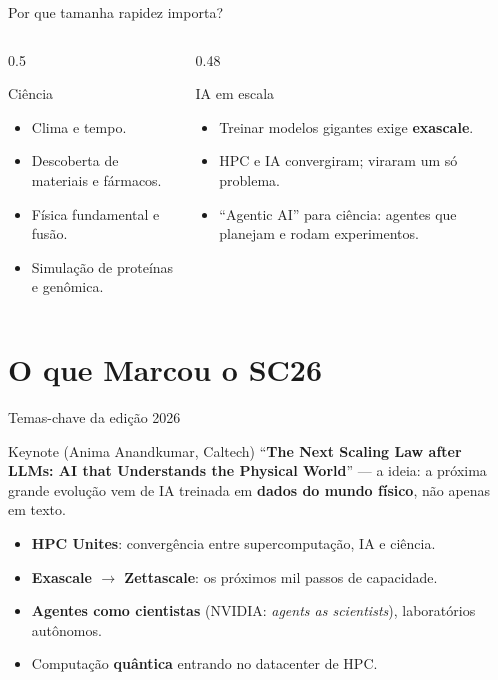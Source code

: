 \documentclass[aspectratio=169, 10pt]{beamer}
\begin{document}
\begin{frame}{Por que tamanha rapidez importa?}
  \begin{columns}
    \begin{column}{0.5\textwidth}
      \begin{block}{Ciência}
        \begin{itemize}
          \item Clima e tempo.
          \item Descoberta de materiais e fármacos.
          \item Física fundamental e fusão.
          \item Simulação de proteínas e genômica.
        \end{itemize}
      \end{block}
    \end{column}
    \begin{column}{0.48\textwidth}
      \begin{block}{IA em escala}
        \begin{itemize}
          \item Treinar modelos gigantes exige \textbf{exascale}.
          \item HPC e IA convergiram; viraram um só problema.
          \item ``Agentic AI'' para ciência: agentes que planejam e rodam experimentos.
        \end{itemize}
      \end{block}
    \end{column}
  \end{columns}
\end{frame}

\section{O que Marcou o SC26}

\begin{frame}{Temas-chave da edição 2026}
  \begin{alertblock}{Keynote (Anima Anandkumar, Caltech)}
    ``\textbf{The Next Scaling Law after LLMs: AI that Understands the Physical World}''
    --- a ideia: a próxima grande evolução vem de IA treinada em \textbf{dados do mundo físico},
    não apenas em texto.
  \end{alertblock}
  \begin{itemize}
    \item \textbf{HPC Unites}: convergência entre supercomputação, IA e ciência.
    \item \textbf{Exascale $\to$ Zettascale}: os próximos mil passos de capacidade.
    \item \textbf{Agentes como cientistas} (NVIDIA: \emph{agents as scientists}), laboratórios autônomos.
    \item Computação \textbf{quântica} entrando no datacenter de HPC.
  \end{itemize}
\end{frame}
\end{document}
